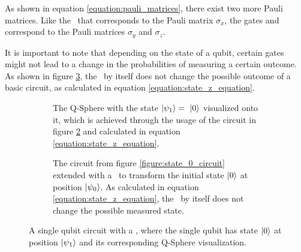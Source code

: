As shown in equation \ref{equation:pauli_matrices}, there exist two more Pauli matrices. Like the \xgate\ that corresponds to the Pauli matrix $\sigma_x$, the gates \ygate\cite{qiskit_ygate_nodate} and \zgate\cite{qiskit_zgate_nodate} correspond to the Pauli matrices $\sigma_y$ and $\sigma_z$. \par

\newpage
It is important to note that depending on the state of a qubit, certain gates might not lead to a change in the probabilities of measuring a certain outcome. As shown in figure \ref{figure:showcase_z_gate}, the \zgate\ by itself does not change the possible outcome of a basic circuit, as calculated in equation \ref{equation:state_z_equation}.

\begin{figure}[!h]
    \begin{subfigure}{.5\textwidth}
        \centering
        \scalebox{\blochwidth}{
            
        }
        \caption{The Q-Sphere with the state $\ket{\psi_1} =\ \ket{0}$ visualized onto it, which is achieved through the usage of the circuit in figure \ref{figure:z_circuit} and calculated in equation \ref{equation:state_z_equation}.}
        \label{figure:state_z_sphere}
    \end{subfigure}
    \begin{subfigure}{.5\textwidth}
        \centering{}
        \caption{The circuit from figure \ref{figure:state_0_circuit} extended with a \zgate\ to transform the initial state $\ket{0}$ at position $\ket{\psi_0}$. As calculated in equation \ref{equation:state_z_equation}, the \zgate\ by itself does not change the possible measured state.}
        \label{figure:z_circuit}
    \end{subfigure}
    \caption{A single qubit circuit with a \zgate, where the single qubit has state $\ket{0}$ at position $\ket{\psi_1}$ and its corresponding Q-Sphere visualization.}
    \label{figure:showcase_z_gate}
\end{figure}


